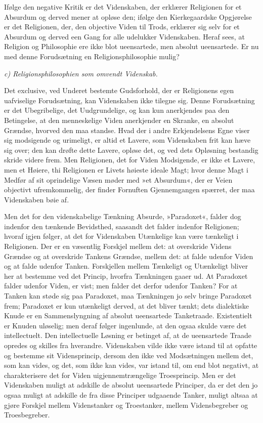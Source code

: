 \documentclass[12pt,a4paper]{article}
\begin{document}
Ifølge den negative Kritik er det Videnskaben, der erklærer
Religionen for et Absurdum og derved mener at opløse den;
ifølge den Kierkegaardske Opgjørelse er det Religionen, der,
den objective Viden til Trods, erklærer sig selv for et Absurdum
og derved een Gang for alle udelukker Videnskaben. Heraf sees,
at Religion og Philosophie ere ikke blot ueensartede, men
absolut ueensartede. Er nu med denne Forudsætning en
Religionsphilosophie mulig?

\medskip

\noindent\textit{c) Religionsphilosophien som omvendt Videnskab.}

\medskip

Det exclusive, ved Underet bestemte Gudsforhold, der er
Religionens egen uafviselige Forudsætning, kan Videnskaben ikke
tilegne sig. Denne Forudsætning er det Ubegribelige, det
Uudgrundelige, og kan kun anerkjendes paa den Betingelse, at
den menneskelige Viden anerkjender en Skranke, en absolut
Grændse, hvorved den maa standse. Hvad der i andre
Erkjendelsens Egne viser sig modsigende og urimeligt, er altid
et Lavere, som Videnskaben frit kan hæve sig over; den kan
drøfte dette Lavere, opløse det, og ved dets Opløsning bestandig
skride videre frem. Men Religionen, det for Viden Modsigende, er
ikke et Lavere, men et Høiere, thi Religionen er Livets høieste
ideale Magt; hvor denne Magt i Medfør af sit oprindelige Væsen
møder med »et Absurdum«, der er Veien objectivt ufremkommelig,
der finder Fornuften Gjennemgangen spærret, der maa Videnskaben
bøie af.

Men det for den videnskabelige Tænkning Absurde, »Paradoxet«,
falder dog indenfor den tænkende Bevidsthed, saasandt det falder
indenfor Religionen; hvoraf igjen følger, at det for Videnskaben
Utænkelige kan være tænkeligt i Religionen. Der er en væsentlig
Forskjel mellem det: at overskride Videns Grændse og at
overskride Tankens Grændse, mellem det: at falde udenfor Viden
og at falde udenfor Tanken. Forskjellen mellem Tænkeligt og
Utænkeligt bliver her at bestemme ved det Princip, hvorfra
Tænkningen gaaer ud. At Paradoxet falder udenfor Viden, er
vist; men falder det derfor udenfor Tanken? For at Tanken kan
støde sig paa Paradoxet, maa Tænkningen jo selv bringe Paradoxet
frem; Paradoxet er kun utænkeligt derved, at det bliver tænkt;
dets dialektiske Knude er en Sammenslyngning af absolut
ueensartede Tanketraade. Existentielt er Knuden uløselig; men
deraf følger ingenlunde, at den ogsaa skulde være det
intellectuelt. Den intellectuelle Løsning er betinget af, at de
ueensartede Traade opredes og skilles fra hverandre.
Videnskaben vilde ikke være istand til at opfatte og bestemme
sit Vidensprincip, dersom den ikke ved Modsætningen mellem det,
som kan vides, og det, som ikke kan vides, var istand til, om
end blot negativt, at charakterisere det for Viden
uigjennemtrængelige Troesprincip. Men er det Videnskaben muligt
at adskille de absolut ueensartede Principer, da er det den jo
ogsaa muligt at adskille de fra disse Principer udgaaende
Tanker, muligt altsaa at gjøre Forskjel mellem Videnstanker og
Troestanker, mellem Vidensbegreber og Troesbegreber.
\end{document}
